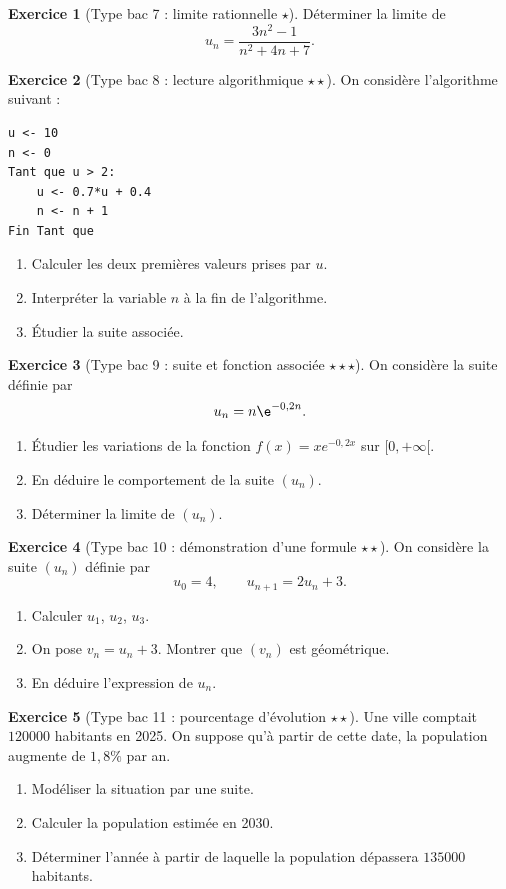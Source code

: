 \documentclass[11pt,a4paper]{article}
\theoremstyle{definition}
\newtheorem{exercice}{Exercice}[section]
\newcommand{\etoile}[1]{\hfill{\small\textbf{#1}}}
\begin{document}
\begin{exercice}[Type bac 7 : limite rationnelle \etoile{$\star$}]
Déterminer la limite de
\[
u_n=\frac{3n^2-1}{n^2+4n+7}.
\]
\end{exercice}

\begin{exercice}[Type bac 8 : lecture algorithmique \etoile{$\star\star$}]
On considère l'algorithme suivant :
\begin{verbatim}
u <- 10
n <- 0
Tant que u > 2:
    u <- 0.7*u + 0.4
    n <- n + 1
Fin Tant que
\end{verbatim}
\begin{enumerate}[label=\arabic*.]
    \item Calculer les deux premières valeurs prises par $u$.
    \item Interpréter la variable $n$ à la fin de l'algorithme.
    \item Étudier la suite associée.
\end{enumerate}
\end{exercice}

\begin{exercice}[Type bac 9 : suite et fonction associée \etoile{$\star\star\star$}]
On considère la suite définie par
\[
u_n=n\e^{-0,2n}.
\]
\begin{enumerate}[label=\arabic*.]
    \item Étudier les variations de la fonction $f(x)=xe^{-0,2x}$ sur $[0,+\infty[$.
    \item En déduire le comportement de la suite $(u_n)$.
    \item Déterminer la limite de $(u_n)$.
\end{enumerate}
\end{exercice}

\begin{exercice}[Type bac 10 : démonstration d'une formule \etoile{$\star\star$}]
On considère la suite $(u_n)$ définie par
\[
u_0=4,\qquad u_{n+1}=2u_n+3.
\]
\begin{enumerate}[label=\arabic*.]
    \item Calculer $u_1$, $u_2$, $u_3$.
    \item On pose $v_n=u_n+3$. Montrer que $(v_n)$ est géométrique.
    \item En déduire l'expression de $u_n$.
\end{enumerate}
\end{exercice}

\begin{exercice}[Type bac 11 : pourcentage d'évolution \etoile{$\star\star$}]
Une ville comptait $120000$ habitants en 2025. On suppose qu'à partir de cette date, la population augmente de $1,8\%$ par an.
\begin{enumerate}[label=\arabic*.]
    \item Modéliser la situation par une suite.
    \item Calculer la population estimée en 2030.
    \item Déterminer l'année à partir de laquelle la population dépassera $135000$ habitants.
\end{enumerate}
\end{exercice}
\end{document}
